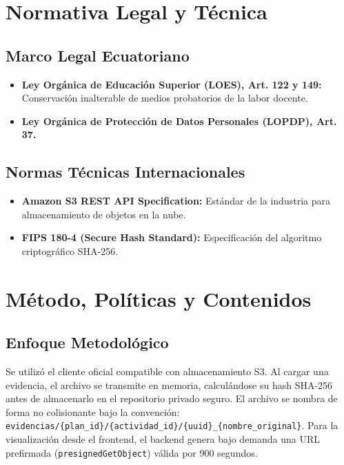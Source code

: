 \documentclass[12pt,a4paper]{article}
\begin{document}
\section{Normativa Legal y Técnica}
\subsection{Marco Legal Ecuatoriano}
\begin{itemize}[leftmargin=1.5em, itemsep=2pt]
    \item \textbf{Ley Orgánica de Educación Superior (LOES), Art. 122 y 149:} Conservación inalterable de medios probatorios de la labor docente.
    \item \textbf{Ley Orgánica de Protección de Datos Personales (LOPDP), Art. 37.}
\end{itemize}
\subsection{Normas Técnicas Internacionales}
\begin{itemize}[leftmargin=1.5em, itemsep=2pt]
    \item \textbf{Amazon S3 REST API Specification:} Estándar de la industria para almacenamiento de objetos en la nube.
    \item \textbf{FIPS 180-4 (Secure Hash Standard):} Especificación del algoritmo criptográfico SHA-256.
\end{itemize}

\section{Método, Políticas y Contenidos}
\subsection{Enfoque Metodológico}
Se utilizó el cliente oficial compatible con almacenamiento S3. Al cargar una evidencia, el archivo se transmite en memoria, calculándose su hash SHA-256 antes de almacenarlo en el repositorio privado seguro. El archivo se nombra de forma no colisionante bajo la convención:
\texttt{evidencias/\allowbreak  \{plan\_\allowbreak  id\}/\{actividad\_id\}/\{uuid\}\_\{nombre\_original\}}. Para la visualización desde el frontend, el backend genera bajo demanda una URL prefirmada (\texttt{presignedGetObject}) válida por 900 segundos.
\end{document}
